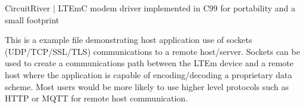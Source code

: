Circuit\+River $\vert$ LTEmC modem driver implemented in C99 for portability and a small footprint

This is a example file demonstrating host application use of sockets (UDP/\+TCP/\+SSL/\+TLS) communications to a remote host/server. Sockets can be used to create a communications path between the LTEm device and a remote host where the application is capable of encoding/decoding a proprietary data scheme. Most users would be more likely to use higher level protocols such as HTTP or MQTT for remote host communication. 
